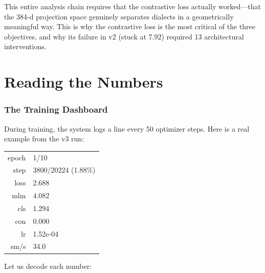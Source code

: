 \documentclass[11pt,a4paper]{article}
\theoremstyle{definition}
\begin{document}
This entire analysis chain requires that the contrastive loss actually
worked---that the 384-d projection space genuinely separates dialects
in a geometrically meaningful way. This is why the contrastive loss is
the most critical of the three objectives, and why its failure in v2
(stuck at 7.92) required 13 architectural interventions.

\newpage
\part{Reading the Numbers}

\section{The Training Dashboard}
\label{sec:dashboard}

During training, the system logs a line every 50 optimizer steps. Here
is a real example from the v3 run:

\begin{center}
\small\ttfamily
\begin{tabular}{rl}
epoch & 1/10 \\
step & 3800/20224 (1.88\%) \\
loss & 2.688 \\
mlm & 4.082 \\
cls & 1.294 \\
con & 0.000 \\
lr & 1.52e-04 \\
sm/s & 34.0 \\
\end{tabular}
\end{center}

Let us decode each number:
\end{document}
